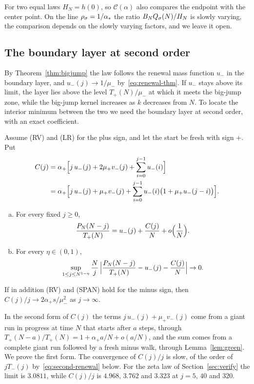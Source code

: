 For two equal laws $H_N=h(0)$, so $\mathcal C(\alpha)$ also compares the endpoint
with the center point. On the line $\rho_\sigma=1/\alpha_*$ the ratio
$B_NQ_\sigma(N)/H_N$ is slowly varying, the comparison depends on the slowly varying
factors, and we leave it open.

\subsection{The boundary layer at second order}\label{sec:second-order}

By Theorem~\ref{thm:bigjump} the law follows the renewal mass function $u_\minus$
in the boundary layer, and $u_\minus(j)\to1/\mu_\minus$ by~\eqref{eq:renewal-thm}.
If $u_\minus$ stays above its limit, the layer lies above the level
$T_\plus(N)/\mu_\minus$ at which it meets the big-jump zone, while the big-jump kernel
increases as $k$ decreases from $N$. To locate the interior minimum between the two
we need the boundary layer at second order, with an exact coefficient.

\begin{theorem}\label{thm:second-order}
Assume (RV) and (LR) for the plus sign, and let the start be fresh with sign
$\plus$. Put
\begin{equation}\label{eq:Cj}
\begin{split}
 C(j)&=\alpha_{+}\Bigl[j\,u_{-}(j)+2\mu_{+} v_{-}(j)+\sum_{i=0}^{j-1}u_{-}(i)\Bigr]\\
 &=\alpha_{+}\Bigl[j\,u_{-}(j)+\mu_{+} v_{-}(j)
 +\sum_{i=0}^{j-1}u_{-}(i)\bigl(1+\mu_{+} u_{-}(j-i)\bigr)\Bigr].
\end{split}
\end{equation}
\begin{enumerate}[(a)]
\item For every fixed $j\ge0$,
\[
 \frac{P_N(N-j)}{T_{+}(N)}=u_{-}(j)+\frac{C(j)}{N}+o\Bigl(\frac1N\Bigr).
\]
\item For every $\eta\in(0,1)$,
\[
 \sup_{1\le j\le N^{1-\eta}}\frac Nj\,\Bigl|\frac{P_N(N-j)}{T_{+}(N)}-u_{-}(j)-\frac{C(j)}{N}\Bigr|\to0 .
\]
\end{enumerate}
If in addition (RV) and (SPAN) hold for the minus sign, then
$C(j)/j\to2\alpha_\plus s/\mu_\minus^2$ as $j\to\infty$.
\end{theorem}

In the second form of $C(j)$ the terms $j\,u_\minus(j)+\mu_\plus v_\minus(j)$ come
from a giant run in progress at time $N$ that starts after $a$ steps, through
$T_\plus(N-a)/T_\plus(N)=1+\alpha_\plus a/N+o(a/N)$, and the sum comes from a complete
giant run followed by a fresh minus walk, through Lemma~\ref{lem:green}. We prove the
first form. The convergence of $C(j)/j$ is slow, of the order of $jT_\minus(j)$
by~\eqref{eq:second-renewal} below. For the zeta law of Section~\ref{sec:verify}
the limit is $3.0811$, while $C(j)/j$ is $4.968$, $3.762$ and $3.323$ at $j=5$, $40$
and $320$.

